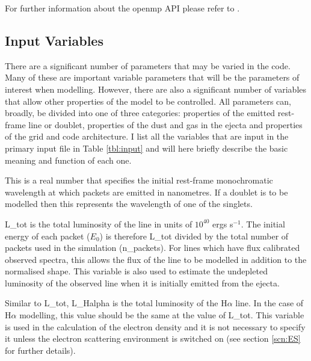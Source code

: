 
	
	For further information about the {\sc openmp} API please refer to \citet{Chapman2007}.
	
	\subsection{Input Variables}
	
	There are a significant number of parameters that may be varied in the code.  Many of these are important variable parameters that will be the parameters of interest when modelling.  However, there are also a significant number of variables that allow other properties of the model to be controlled.  All parameters can, broadly,  be divided into one of three categories:  properties of the emitted rest-frame line or doublet, properties of the dust and gas in the ejecta and properties of the grid and code architecture.  I list all the variables that are input in the primary input file in Table \ref{tbl:input} and will here briefly describe the basic meaning and function of each one.
	
	

This is a real number that specifies the initial rest-frame monochromatic wavelength at which packets are emitted in nanometres.  If a doublet is to be modelled then this represents the wavelength of one of the singlets.


L\_tot is the total luminosity of the line in units of $10^{40}$ ergs s$^{-1}$.  The initial energy of each packet ($E_0$) is therefore L\_tot divided by the total number of packets used in the simulation (n\_packets). For lines which have flux calibrated observed spectra, this allows the flux of the line to be modelled in addition to the normalised shape.  This variable is also used to estimate the undepleted luminosity of the observed line when it is initially emitted from the ejecta.


Similar to L\_tot, L\_Halpha is the total luminosity of the H${\alpha}$ line.  In the case of H${\alpha}$ modelling, this value should be the same at the value of L\_tot.  This variable is used in the calculation of the electron density and it is not necessary to specify it unless the electron scattering environment is switched on (see section \ref{scn:ES} for further details).  

